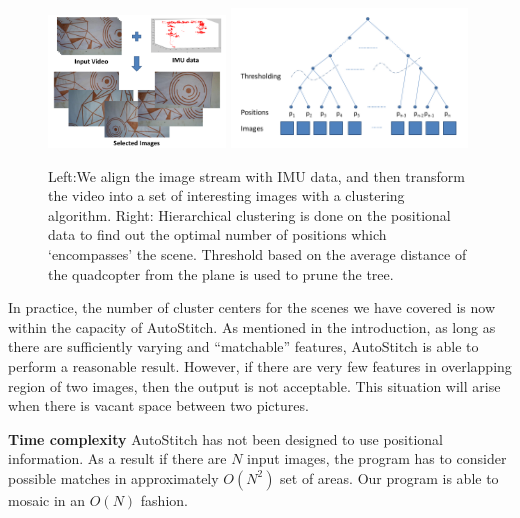 
\begin{figure}[t!]
  \centering
  \includegraphics[width=0.42\textwidth]{figures/vacantSpaces/selection} 
  \includegraphics[width=0.56\textwidth]{figures/vacantSpaces/clustering}
  \caption[Selection of Images]{ \label{fig:selection} Left:We align the image
  stream with IMU data, and then transform the video into a set of interesting
    images with a clustering algorithm. Right: Hierarchical clustering is done
    on the positional data to find out the optimal number of positions which
    `encompasses' the scene. Threshold based on the average distance of the
    quadcopter from the plane is used to prune the tree.}
\end{figure}    

In practice, the number of cluster centers for the scenes we have
covered is now within the capacity of AutoStitch.  As mentioned in the
introduction, as long as there are sufficiently varying and
``matchable'' features, AutoStitch is able to perform a reasonable
result.  However, if there are very few features in overlapping region
of two images, then the output is not acceptable. This situation will
arise when there is vacant space between two pictures.

{\bf Time complexity} AutoStitch has not been designed
to use positional information. As a result if there are $N$ input
images, the program has to consider possible matches in approximately
$O(N^2)$ set of areas.  Our program is able to mosaic in an $O(N)$
fashion.

